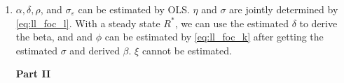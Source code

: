 \documentclass[12pt]{article}
\begin{document}
\begin{enumerate}[label=(\alph*)]
    The consumption-investment equation can be log linearized as
    \begin{align}\label{eq:ll_consumption_investment}
        \hat{y}_t = \hat{c}_t \frac{C^*}{Y^*} + \hat{\iota}_t \frac{I^*}{Y^*}.
    \end{align}

    The LoM can be log linearized as
    \begin{align}\label{eq:ll_lom}
        \hat{k}_t = (1-\delta) \hat{k}_{t-1} + \delta \hat{\iota}_t.
    \end{align}

    The prices can be log linearized as
    \begin{align}
        \hat{r}_t = \hat{y}_t - \hat{k}_{t-1}, \label{eq:ll_mpk}\\
        \hat{w}_t = \hat{y}_t - \hat{\ell}_t. \label{eq:ll_mpl}
    \end{align}

    The productivity can be log linearized as
    \begin{align}\label{eq:ll_z}
        \hat{z}_t = \rho\hat{z}_{t-1} + \varepsilon_t
    \end{align}

    \item $\alpha, \delta, \rho$, and $\sigma_\varepsilon$ can be estimated by OLS. $\eta$ and $\sigma$ are jointly determined by \eqref{eq:ll_foc_l}. With a steady state $R^*$, we can use the estimated $\delta$ to derive the beta, and and $\phi$ can be estimated by \eqref{eq:ll_foc_k} after getting the estimated $\sigma$ and derived $\beta$. $\xi$ cannot be estimated.


    \newpage
\noindent\textbf{Part II}


\end{enumerate}
\end{document}
